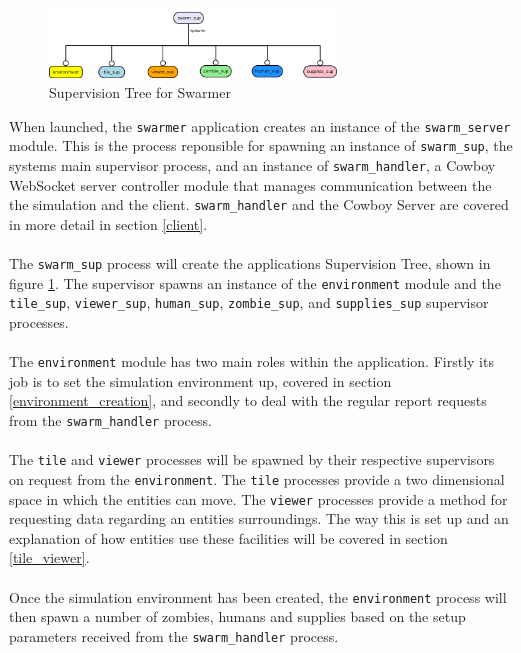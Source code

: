 \documentclass[10pt, a4paper, conference, compsocconf]{IEEEtran}
\begin{document}
\begin{figure}[h]
  \centering
  \includegraphics[width=3in]{../img/supervisor.png}
\caption{Supervision Tree for Swarmer}
    \label{fig:sup_tree}
\end{figure}

When launched, the \verb+swarmer+ application creates an instance of the \verb+swarm_server+ module. This is the process reponsible for spawning an instance of \verb+swarm_sup+, the systems main supervisor process, and an instance of \verb+swarm_handler+, a Cowboy WebSocket server \cite{cowboy} controller module that manages communication between the the simulation and the client. \verb+swarm_handler+ and the Cowboy Server are covered in more detail in section \ref{client}.\\
\\
The \verb+swarm_sup+ process will create the applications Supervision Tree, shown in figure \ref{fig:sup_tree}. The supervisor spawns an instance of the \verb+environment+ module and the \verb+tile_sup+, \verb+viewer_sup+, \verb+human_sup+, \verb+zombie_sup+, and \verb+supplies_sup+ supervisor processes.\\
\\
The \verb+environment+ module has two main roles within the application. Firstly its job is to set the simulation environment up, covered in section \ref{environment_creation}, and secondly to deal with the regular report requests from the \verb+swarm_handler+ process.\\
\\
The \verb+tile+ and \verb+viewer+ processes will be spawned by their respective supervisors on request from the \verb+environment+. The \verb+tile+ processes provide a two dimensional space in which the entities can move. The \verb+viewer+ processes provide a method for requesting data regarding an entities surroundings. The way this is set up and an explanation of how entities use these facilities will be covered in section \ref{tile_viewer}.\\
\\
Once the simulation environment has been created, the \verb+environment+ process will then spawn a number of zombies, humans and supplies based on the setup parameters received from the \verb+swarm_handler+ process.\\
\end{document}
